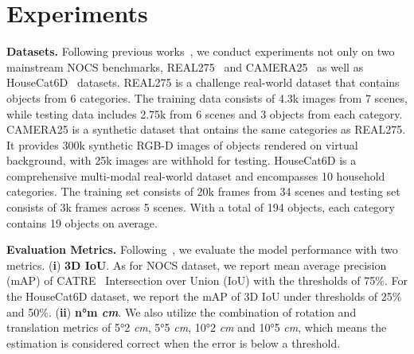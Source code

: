 \section{Experiments}
\label{sec:Experiments}

{\bf Datasets.} Following previous works~\cite{lin2023vi,lin2024instance,lin2024clipose,zheng2024georef,chen2024secondpose}, we conduct experiments not only on two mainstream NOCS benchmarks, REAL275~\cite{wang2019normalized} and CAMERA25~\cite{wang2019normalized} as well as HouseCat6D~\cite{jung2024housecat6d} datasets.
REAL275 is a challenge real-world dataset that contains objects from 6 categories. The training data consists of 4.3k images from 7 scenes, while testing data includes 2.75k from 6 scenes and 3 objects from each category.
CAMERA25 is a synthetic dataset that ontains the same categories as REAL275. It provides 300k synthetic RGB-D images of objects rendered on virtual background, with 25k images are withhold for testing.
HouseCat6D is a comprehensive multi-modal real-world dataset and encompasses 10 household categories.
The training set consists of 20k frames from 34 scenes and testing set consists of 3k frames across 5 scenes. With a total of 194 objects, each category contains 19 objects on average.


\noindent
{\bf Evaluation Metrics.} Following~\cite{chen2024secondpose,lin2024instance}, we evaluate the model performance with two metrics. (\textbf{i}) \textbf{3D IoU}. As for NOCS dataset, we report mean average precision (mAP) of CATRE~\cite{liu2022catre} Intersection over Union (IoU) with the thresholds of 75\%. For the HouseCat6D dataset, we report the mAP of 3D IoU under thresholds of 25\% and 50\%. (\textbf{ii}) \textbf{n°m \emph{cm}}.  We also utilize the combination of rotation and translation metrics of 5°2 \emph{cm}, 5°5 \emph{cm}, 10°2 \emph{cm} and 10°5 \emph{cm}, which means the estimation is considered correct when the error is below a threshold. 

